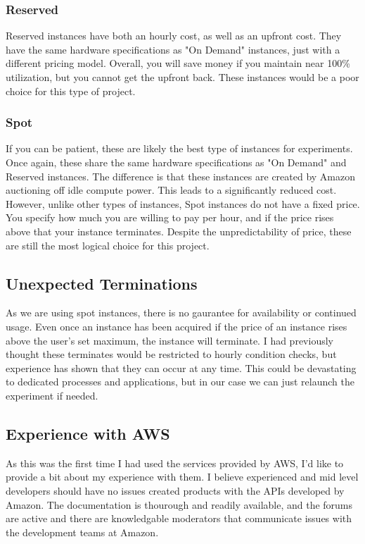 \documentclass{article}
\begin{document}
\subsubsection{Reserved}
Reserved instances have both an hourly cost, as well as an upfront cost. They have the same hardware specifications as "On Demand" instances, just with a different pricing model. Overall, you will save money if you maintain near 100\% utilization, but you cannot get the upfront back. These instances would be a poor choice for this type of project.
\subsubsection{Spot}
If you can be patient, these are likely the best type of instances for experiments. Once again, these share the same hardware specifications as "On Demand" and Reserved instances. The difference is that these instances are created by Amazon auctioning off idle compute power. This leads to a significantly reduced cost.
However, unlike other types of instances, Spot instances do not have a fixed price. You specify how much you are willing to pay per hour, and if the price rises above that your instance terminates. Despite the unpredictability of price, these are still the most logical choice for this project.
\subsection{Unexpected Terminations}
As we are using spot instances, there is no gaurantee for availability or continued usage. Even once an instance has been acquired if the price of an instance rises above the user's set maximum, the instance will terminate. I had previously thought these terminates would be restricted to hourly condition checks, but experience has shown that they can occur at any time. This could be devastating to dedicated processes and applications, but in our case we can just relaunch the experiment if needed.
\subsection{Experience with AWS}
As this was the first time I had used the services provided by AWS, I'd like to provide a bit about my experience with them. I believe experienced and mid level developers should have no issues created products with the APIs developed by Amazon. The documentation is thourough and readily available, and the forums are active and there are knowledgable moderators that communicate issues with the development teams at Amazon.
\end{document}
